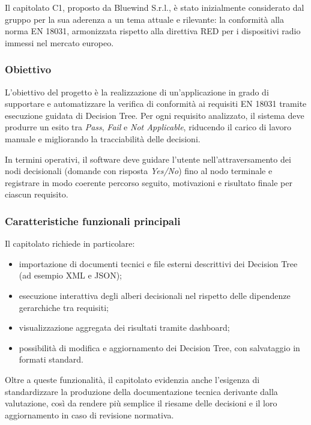 \documentclass[a4paper,12pt]{article}
\begin{document}
Il capitolato C1, proposto da Bluewind S.r.l., è stato inizialmente considerato dal gruppo per la sua aderenza a un tema attuale e rilevante: la conformità alla norma EN 18031, armonizzata rispetto alla direttiva RED per i dispositivi radio immessi nel mercato europeo.


\subsubsection{Obiettivo}

L'obiettivo del progetto è la realizzazione di un'applicazione in grado di supportare e automatizzare la verifica di conformità ai requisiti EN 18031 tramite esecuzione guidata di Decision Tree. Per ogni requisito analizzato, il sistema deve produrre un esito tra \textit{Pass}, \textit{Fail} e \textit{Not Applicable}, riducendo il carico di lavoro manuale e migliorando la tracciabilità delle decisioni.

In termini operativi, il software deve guidare l'utente nell'attraversamento dei nodi decisionali (domande con risposta \textit{Yes/No}) fino al nodo terminale e registrare in modo coerente percorso seguito, motivazioni e risultato finale per ciascun requisito.

\subsubsection{Caratteristiche funzionali principali}

Il capitolato richiede in particolare:

\begin{itemize}
    \item importazione di documenti tecnici e file esterni descrittivi dei Decision Tree (ad esempio XML e JSON);
    \item esecuzione interattiva degli alberi decisionali nel rispetto delle dipendenze gerarchiche tra requisiti;
    \item visualizzazione aggregata dei risultati tramite dashboard;
    \item possibilità di modifica e aggiornamento dei Decision Tree, con salvataggio in formati standard.
\end{itemize}

Oltre a queste funzionalità, il capitolato evidenzia anche l'esigenza di standardizzare la produzione della documentazione tecnica derivante dalla valutazione, così da rendere più semplice il riesame delle decisioni e il loro aggiornamento in caso di revisione normativa.
\end{document}
